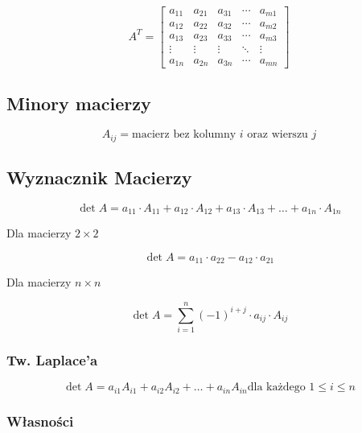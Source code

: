 \documentclass{../notatki}
\begin{document}
$$
A^T =
\begin{bmatrix}
  a_{11} & a_{21} & a_{31} & \cdots & a_{m1} \\
  a_{12} & a_{22} & a_{32} & \cdots & a_{m2} \\
  a_{13} & a_{23} & a_{33} & \cdots & a_{m3} \\
  \vdots & \vdots & \vdots & \ddots & \vdots \\
  a_{1n} & a_{2n} & a_{3n} & \cdots & a_{mn}
\end{bmatrix}
$$

\subsection{Minory macierzy}

$$
A_{ij} = \text{macierz bez kolumny } i \text{ oraz wierszu } j
$$

\subsection{Wyznacznik Macierzy}

$$
\det A = a_{11} \cdot A_{11} + a_{12} \cdot A_{12} + a_{13} \cdot
A_{13} + \dots + a_{1n} \cdot A_{1n}
$$

Dla macierzy $2 \times 2$

$$
\det A = a_{11} \cdot a_{22} - a_{12} \cdot a_{21}
$$

Dla macierzy $n \times n$

$$
\det A = \sum_{i=1}^{n} (-1)^{i+j} \cdot a_{ij} \cdot A_{ij}
$$

\subsubsection{Tw. Laplace'a}

$$
\det A = a_{i1}A_{i1} + a_{i2}A_{i2} + \dots + a_{in}A_{in} \text{
dla każdego } 1 \le i \le n
$$

\subsubsection{Własności}
\end{document}
